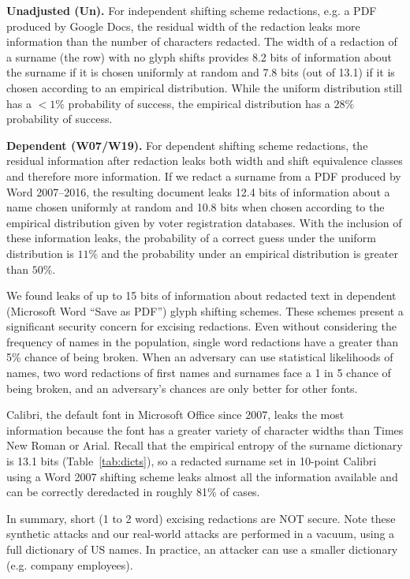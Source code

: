\textbf{Unadjusted (Un).} For independent shifting scheme redactions, e.g. a PDF produced by Google Docs, the residual width of the redaction leaks more information than the number of characters redacted.
The width of a redaction of a surname (the \emph{\nadjshortname} row) with no glyph shifts provides 8.2 bits of information about the surname if it is chosen uniformly at random and 7.8 bits (out of 13.1) if it is chosen according to an empirical distribution. 
While the uniform distribution still has a $<1\%$ probability of success, the empirical distribution has a $28\%$ probability of success.

\textbf{Dependent (W07/W19).} For dependent shifting scheme redactions, the residual information after redaction leaks both width and shift equivalence classes and therefore more information.
If we redact a surname from a PDF produced by Word 2007--2016, the resulting document leaks 12.4 bits of information about a name chosen uniformly at random and 10.8 bits when chosen according to the empirical distribution given by voter registration databases.
With the inclusion of these information leaks, the probability of a correct guess under the uniform distribution is $11\%$ and the probability under an empirical distribution is greater than $50\%$.

We found leaks of up to 15 bits of information about redacted text in dependent (Microsoft Word ``Save as PDF'') glyph shifting schemes.
These schemes present a significant security concern for excising redactions.
Even without considering the frequency of names in the population, single word redactions have a greater than 5\% chance of being broken.
When an adversary can use statistical likelihoods of names, two word redactions of first names and surnames face a 1 in 5 chance of being broken, and an adversary's chances are only better for other fonts.

Calibri, the default font in Microsoft Office since 2007, leaks the most information because the font has a greater variety of character widths than Times New Roman or Arial. 
Recall that the empirical entropy of the surname dictionary is 13.1 bits (Table~\ref{tab:dicts}), so a redacted surname set in 10-point Calibri using a Word 2007 shifting scheme leaks almost all the information available and can be correctly deredacted in roughly 81\% of cases.

In summary, short (1 to 2 word) excising redactions are NOT secure.
Note these synthetic attacks and our real-world attacks are performed in a vacuum, using a full dictionary of US names.
In practice, an attacker can use a smaller dictionary (e.g. company employees).

